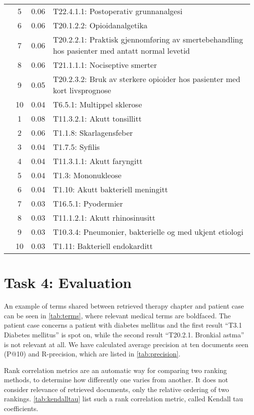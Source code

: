 \begin{table}[htbp]
\begin{tabularx}{\textwidth}{c c c X}
     & 5 & 0.06 & T22.4.1.1: Postoperativ grunnanalgesi \\
     & 6 & 0.06 & T20.1.2.2: Opioidanalgetika \\
     & 7 & 0.06 & T20.2.2.1: Praktisk gjennomføring av smertebehandling hos pasienter med antatt normal levetid \\
     & 8 & 0.06 & T21.1.1.1: Nociseptive smerter \\
     & 9 & 0.05 & T20.2.3.2: Bruk av sterkere opioider hos pasienter med kort livsprognose \\
     & 10 & 0.04 & T6.5.1: Multippel sklerose \\
	\addlinespace
    8 & 1 & 0.08 & T11.3.2.1: Akutt tonsillitt \\
     & 2 & 0.06 & T1.1.8: Skarlagensfeber \\
     & 3 & 0.04 & T1.7.5: Syfilis \\
     & 4 & 0.04 & T11.3.1.1: Akutt faryngitt \\
     & 5 & 0.04 & T1.3: Mononukleose \\
     & 6 & 0.04 & T1.10: Akutt bakteriell meningitt \\
     & 7 & 0.03 & T16.5.1: Pyodermier \\
     & 8 & 0.03 & T11.1.2.1: Akutt rhinosinusitt \\
     & 9 & 0.03 & T10.3.4: Pneumonier, bakterielle og med ukjent etiologi \\
     & 10 & 0.03 & T1.11: Bakteriell endokarditt \\
	\bottomrule
\end{tabularx}
\end{table}


\section{Task 4: Evaluation}
An example of terms shared between retrieved therapy
chapter and patient case can be seen in \autoref{tab:terms}, where
relevant medical terms are boldfaced. The patient case concerns a patient with
diabetes mellitus and the first result ``T3.1 Diabetes mellitus'' is spot on,
while the second result ``T20.2.1. Bronkial astma'' is not relevant at all.
We have calculated average precision at ten documents seen (P@10) and
R-precision, which are listed in \autoref{tab:precision}.

Rank correlation metrics are an automatic way for comparing two ranking
methods, to determine how differently one varies from another. It does not
consider relevance of retrieved documents, only the relative ordering of two
rankings. \autoref{tab:kendalltau} list such a rank correlation metric, called
Kendall tau coefficients.

